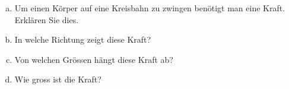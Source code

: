 \begin{aufgabe}
\begin{enumerate} [a)]
\item Um einen Körper auf eine Kreisbahn zu zwingen benötigt man eine Kraft. Erklären Sie dies.
\item In welche Richtung zeigt diese Kraft?
\item Von welchen Grössen hängt diese Kraft ab?
\item Wie gross ist die Kraft?
\end{enumerate}
\end{aufgabe}
